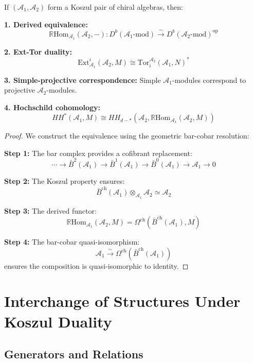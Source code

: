 \begin{theorem}
If $(\mathcal{A}_1, \mathcal{A}_2)$ form a Koszul pair of chiral algebras, then:

\textbf{1. Derived equivalence:}
$$\mathbb{R}\text{Hom}_{\mathcal{A}_1}(\mathcal{A}_2, -): D^b(\mathcal{A}_1\text{-mod}) \xrightarrow{\sim} D^b(\mathcal{A}_2\text{-mod})^{\text{op}}$$

\textbf{2. Ext-Tor duality:}
$$\text{Ext}^i_{\mathcal{A}_1}(\mathcal{A}_2, M) \cong \text{Tor}_i^{\mathcal{A}_2}(\mathcal{A}_1, N)^*$$

\textbf{3. Simple-projective correspondence:}
Simple $\mathcal{A}_1$-modules correspond to projective $\mathcal{A}_2$-modules.

\textbf{4. Hochschild cohomology:}
$$HH^*(\mathcal{A}_1, M) \cong HH_{d-*}(\mathcal{A}_2, \mathbb{R}\text{Hom}_{\mathcal{A}_1}(\mathcal{A}_2, M))$$
\end{theorem}

\begin{proof}
We construct the equivalence using the geometric bar-cobar resolution:

\textbf{Step 1:} The bar complex provides a cofibrant replacement:
$$\cdots \to \bar{B}^2(\mathcal{A}_1) \to \bar{B}^1(\mathcal{A}_1) \to \bar{B}^0(\mathcal{A}_1) \to \mathcal{A}_1 \to 0$$

\textbf{Step 2:} The Koszul property ensures:
$$\bar{B}^{\text{ch}}(\mathcal{A}_1) \otimes_{\mathcal{A}_1} \mathcal{A}_2 \simeq \mathcal{A}_2$$

\textbf{Step 3:} The derived functor:
$$\mathbb{R}\text{Hom}_{\mathcal{A}_1}(\mathcal{A}_2, M) = \Omega^{\text{ch}}(\bar{B}^{\text{ch}}(\mathcal{A}_1), M)$$

\textbf{Step 4:} The bar-cobar quasi-isomorphism:
$$\mathcal{A}_1 \xrightarrow{\sim} \Omega^{\text{ch}}(\bar{B}^{\text{ch}}(\mathcal{A}_1))$$
ensures the composition is quasi-isomorphic to identity.
\end{proof}


\section{Interchange of Structures Under Koszul Duality}

\subsection{Generators and Relations}


